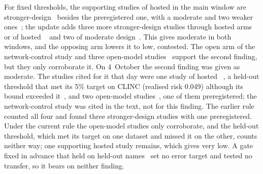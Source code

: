 For fixed thresholds, the supporting studies of hosted \jev{} in the main window are stronger-design~\cite{arx29429,arx00346,arx01006,arx26550,arx39496,zen22952571}\zmark{} besides the preregistered one, with a moderate and two weaker ones~\cite{arx27607,arx02046,jkf87_2026replication}\gmark{}; the update adds three more stronger-design studies through hosted arms or of hosted \jev{}~\cite{arx03387,arx02267,zen22935043}\zmark{} and two of moderate design~\cite{arx04985,zen23050542}\zmark{}. This gives moderate in both windows, and the opposing arm lowers it to low, contested.
The open arm of the network-control study and three open-model studies~\cite{arx33843,zen23041163,arx07177}\zmark{} support the second finding, but they only corroborate it.
On 4~October the second finding was given as moderate. The studies cited for it that day were one study of hosted \jev{}~\cite{arx33401}, a held-out threshold that met its 5\% target on CLINC (realised risk 0.049) although its bound exceeded it~\cite{arx00346}, and two open-model studies~\cite{arx33843,zen23041163}\zmark{}, one of them preregistered; the network-control study was cited in the text, not for this finding. The earlier rule counted all four and found three stronger-design studies with one preregistered. Under the current rule the open-model studies only corroborate, and the held-out threshold, which met its target on one dataset and missed it on the other, counts neither way; one supporting hosted study remains, which gives very low.
A gate fixed in advance that held on held-out names~\cite{zen23088660}\zmark{} set no error target and tested no transfer, so it bears on neither finding.

